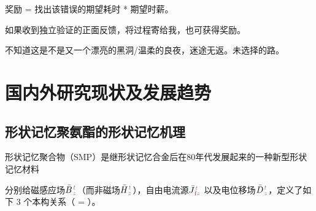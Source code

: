 奖励 = 找出该错误的期望耗时 * 期望时薪。

如果收到独立验证的正面反馈，将过程寄给我，也可获得奖励。

不知道这是不是又一个漂亮的黑洞/温柔的良夜，迷途无返。未选择的路。

\section{国内外研究现状及发展趋势}\label{sec:tttt}

\subsection{形状记忆聚氨酯的形状记忆机理}\label{ssec:tttt}

形状记忆聚合物（SMP）是继形状记忆合金后在80年代发展起来的一种新型形状记忆材料

分别给磁感应场$\bar{B}^{\;\!\mathcolor{gray}{t}}_{\;\!\mathcolor{gray}{z}}$（而非磁场$\bar{H}^{\;\!\mathcolor{gray}{t}}_{\;\!\mathcolor{gray}{z}}$），自由电流源$\bar{J}^{\;\!\mathcolor{gray}{t}}_{\;\!\textcolor{Maroon}{\text{f}}\mathcolor{gray}{z}}$ 以及电位移场$\bar{D}^{\;\!\mathcolor{gray}{t}}_{\;\!\mathcolor{gray}{z}}$，定义了如下 3 个本构关系（\textcolor{Maroon}{} = \textcolor{Maroon}{}）。

